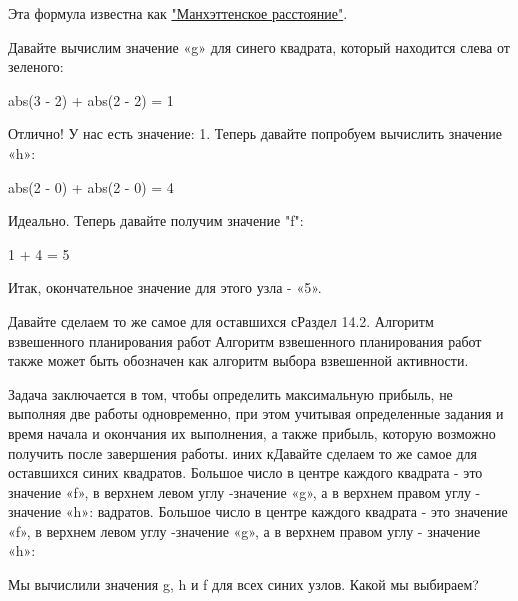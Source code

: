 Эта формула известна как \href{ссылка}{\color{Purple}"Манхэттенское расстояние"}.

\vspace{\baselineskip}

Давайте вычислим значение «g» для синего квадрата, который находится слева от зеленого:

\vspace{\baselineskip}

\colorbox{gray!10!white}{ \parbox{12em}{abs(3 - 2) + abs(2 - 2) = 1}}

\vspace{\baselineskip}

Отлично! У нас есть значение: 1. Теперь давайте попробуем вычислить значение «h»:
\colorbox{gray!10!white}{ \parbox{12em}{abs(2 - 0) + abs(2 - 0) = 4}}

\vspace{\baselineskip}

Идеально. Теперь давайте получим значение "f": \colorbox{gray!10!white}{ \parbox{4em}{1 + 4 = 5}}

\vspace{\baselineskip}

Итак, окончательное значение для этого узла - «5».

\vspace{\baselineskip}

Давайте сделаем то же самое для оставшихся сРаздел 14.2. Алгоритм взвешенного планирования работ 
Алгоритм взвешенного планирования работ также может быть обозначен как алгоритм выбора взвешенной активности.

Задача заключается в том, чтобы определить максимальную прибыль, не выполняя две работы одновременно, при этом учитывая определенные задания и время начала и окончания их выполнения, а также прибыль, которую возможно получить после завершения работы.
иних кДавайте сделаем то же самое для оставшихся синих квадратов. Большое число в центре каждого квадрата - это значение «f», в верхнем левом углу -значение «g», а в  верхнем правом углу - значение «h»: вадратов. Большое число в центре каждого квадрата - это значение «f», в верхнем левом углу -значение «g», а в  верхнем правом углу - значение «h»:

\vspace{\baselineskip}


Мы вычислили значения g, h и f для всех синих узлов. Какой мы выбираем?

\vspace{\baselineskip}

